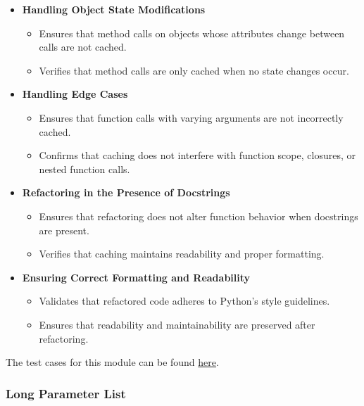 \documentclass[12pt, titlepage]{article}
\begin{document}
\begin{enumerate}[label={\bf \textcolor{Maroon}{test-SRT-\arabic*}}, wide=0pt, font=\itshape]
\begin{itemize}
    \item \textbf{Handling Object State Modifications}
    \begin{itemize}
        \item Ensures that method calls on objects whose attributes change between calls are not cached.
        \item Verifies that method calls are only cached when no state changes occur.
    \end{itemize}

    \item \textbf{Handling Edge Cases}
    \begin{itemize}
        \item Ensures that function calls with varying arguments are not incorrectly cached.
        \item Confirms that caching does not interfere with function scope, closures, or nested function calls.
    \end{itemize}

    \item \textbf{Refactoring in the Presence of Docstrings}
    \begin{itemize}
        \item Ensures that refactoring does not alter function behavior when docstrings are present.
        \item Verifies that caching maintains readability and proper formatting.
    \end{itemize}

    \item \textbf{Ensuring Correct Formatting and Readability}
    \begin{itemize}
        \item Validates that refactored code adheres to Python’s style guidelines.
        \item Ensures that readability and maintainability are preserved after refactoring.
    \end{itemize}
\end{itemize}

\noindent The test cases for this module can be found \href{https://github.com/ssm-lab/capstone--source-code-optimizer/blob/new-poc/tests/refactorers/test_repeated_calls.py}{here}.

\subsubsection{Long Parameter List}


\end{enumerate}
\end{document}
